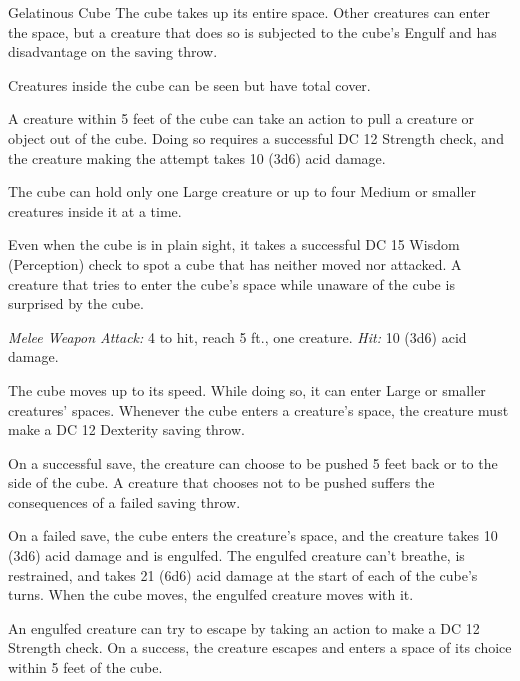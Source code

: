 \documentclass[10pt,a4paper,twoside,bg=print,twocolumn,openany,nodeprecatedcode]{dndbook}
\begin{document}
\begin{DndMonster}[float=t]{Gelatinous Cube}
\DndMonsterBasics[
armor-class = {6},
hit-points = {\DndDice{8d10 + 40}},
speed = {15 ft.}
]
\DndMonsterAbilityScores[
 str = 14,
 dex = 3,
 con = 20,
 int = 1,
 wis = 6,
 cha = 1
]
\DndMonsterDetails[
condition-immunities = {blinded, charmed, deafened, exhaustion, frightened, prone},
senses = {blindsight 60 ft. (blind beyond this radius), passive perception 8},
challenge = 2,
]
The cube takes up its entire space. Other creatures can enter the space, but a creature that does so is subjected to the cube's Engulf and has disadvantage on the saving throw.

Creatures inside the cube can be seen but have total cover.

A creature within 5 feet of the cube can take an action to pull a creature or object out of the cube. Doing so requires a successful DC 12 Strength check, and the creature making the attempt takes 10 (3d6) acid damage.

The cube can hold only one Large creature or up to four Medium or smaller creatures inside it at a time.

Even when the cube is in plain sight, it takes a successful DC 15 Wisdom (Perception) check to spot a cube that has neither moved nor attacked. A creature that tries to enter the cube's space while unaware of the cube is surprised by the cube.

\textsl{Melee Weapon Attack:} 4 to hit, reach 5 ft., one creature. \textsl{Hit:} 10 (3d6) acid damage.

The cube moves up to its speed. While doing so, it can enter Large or smaller creatures' spaces. Whenever the cube enters a creature's space, the creature must make a DC 12 Dexterity saving throw.

On a successful save, the creature can choose to be pushed 5 feet back or to the side of the cube. A creature that chooses not to be pushed suffers the consequences of a failed saving throw.

On a failed save, the cube enters the creature's space, and the creature takes 10 (3d6) acid damage and is engulfed. The engulfed creature can't breathe, is restrained, and takes 21 (6d6) acid damage at the start of each of the cube's turns. When the cube moves, the engulfed creature moves with it.

An engulfed creature can try to escape by taking an action to make a DC 12 Strength check. On a success, the creature escapes and enters a space of its choice within 5 feet of the cube.

\end{DndMonster}
\end{document}
